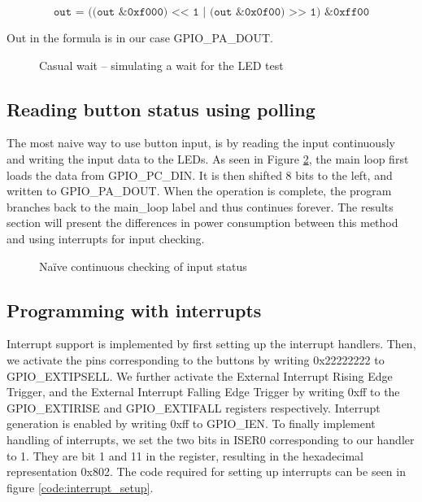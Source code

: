 $$ \texttt{out = ((out \& 0xf000) << 1 | (out \& 0x0f00) >> 1) \& 0xff00} $$

Out in the formula is in our case GPIO\_PA\_DOUT.


\begin{figure}[h!]
\caption{Casual wait – simulating a wait for the LED test}
\label{code:casual_wait}
\end{figure}

\subsection{Reading button status using polling}
\label{subsec:polling}

The most naive way to use button input, is by reading the input continuously and writing the input data to the LEDs.
As seen in Figure \ref{code:polling}, the main loop first loads the data from GPIO\_PC\_DIN.
It is then shifted 8 bits to the left, and written to GPIO\_PA\_DOUT.
When the operation is complete, the program branches back to the main\_loop label and thus continues forever.
The results section will present the differences in power consumption between this method and using interrupts for input checking.

\begin{figure}[h!]
\caption{Naïve continuous checking of input status}
\label{code:polling}
\end{figure}

\subsection{Programming with interrupts}
\label{subsec:dev_pros_interrupts}

Interrupt support is implemented by first setting up the interrupt handlers.
Then, we activate the pins corresponding to the buttons by writing 0x22222222 to GPIO\_EXTIPSELL.
We further activate the External Interrupt Rising Edge Trigger, and the External Interrupt Falling Edge Trigger by writing 0xff to the GPIO\_EXTIRISE and GPIO\_EXTIFALL registers respectively.
Interrupt generation is enabled by writing 0xff to GPIO\_IEN.
To finally implement handling of interrupts, we set the two bits in ISER0 corresponding to our handler to 1. They are bit 1 and 11 in the register, resulting in the hexadecimal representation 0x802.
The code required for setting up interrupts can be seen in figure \ref{code:interrupt_setup}.

